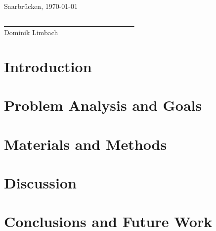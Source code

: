 \documentclass[
    12pt,
    a4paper,
	chapterprefix=false,
	parskip=full,
	headings=normal,
	numbers=noenddot
]{scrreprt}
\begin{document}
\vspace{1cm}

Saarbrücken, \today\\

\vspace{1.5cm}

\underline{~ ~ ~ ~ ~ ~ ~ ~ ~ ~ ~ ~ ~ ~ ~ ~ ~ ~ ~ ~ ~ ~ ~}\\
\small
Dominik Limbach
\normalsize

\newpage

\renewcommand{\contentsname}{Contents}
\hypersetup{linkcolor=black}
\tableofcontents
\hypersetup{linkcolor=darkblue}

\newpage


\chapter{Introduction}




\chapter{Problem Analysis and Goals}




\chapter{Materials and Methods}





%


\chapter{Discussion}




\chapter{Conclusions and Future Work}



\end{document}

